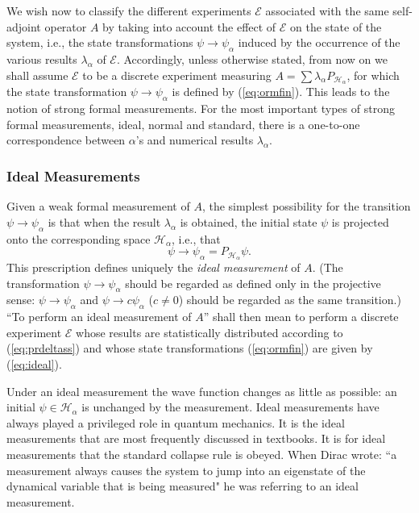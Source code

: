 \documentclass[12pt]{article}
\newcommand{\eq}[1]{(\ref{#1})}
\newcommand{\sa}{self-adjoint}
\newcommand{\wf}{wave function}
\renewcommand{\a}{\alpha}
\newcommand{\la}{\lambda_{\a}}
\newcommand{\psia}{\psi_{\a}}
\newcommand{\Ha}{{\H}_{\a}}
\renewcommand{\H}{\mbox{$\mathcal{H}$}}
\newcommand{\Pa}{ P_{ {\mathcal{H}_{\a} } } }
\newcommand{\E}{\mbox{$\mathscr{E}$}}
\begin{document}
We wish now to classify the different experiments \E{} associated with
the same \sa{} operator $A$ by taking into account the effect of \E{}
on the state of the system, i.e., the state transformations $\psi \to
\psia$ induced by the occurrence of the various results $\la$ of \E{}.
Accordingly, unless otherwise stated, {}from now on we shall assume
$\E$ to be a discrete experiment measuring $A=\sum\la\Pa$, for which
the state transformation $\psi \to \psia$ is defined by
\eq{eq:ormfin}.  This leads to the notion of strong formal
measurements. For the most important types of strong formal
measurements, ideal, normal and standard, there is a one-to-one
correspondence between $\a$'s and numerical results $\la$.

\subsubsection{Ideal Measurements} \label{sec:IM}
Given a weak formal measurement of $A$, the simplest possibility for
the transition $\psi\to\psia$ is that when the result $\la$ is
obtained, the initial state $\psi$ is projected onto the corresponding
space $\Ha$, i.e., that
\begin{equation}
\psi \to \psia = \Pa \psi.
\label{eq:ideal}
\end{equation}
%
This prescription defines uniquely the \emph{ideal measurement} of
$A$.  (The transformation $\psi\to\psia$ should be regarded as defined
only in the projective sense: $\psi \to \psi_\a$ and $\psi \to
c\psi_\a$ ($c\neq 0$) should be regarded as the same transition.)
``To perform an ideal measurement of $A$'' shall then mean to perform
a discrete experiment \E{} whose results are statistically distributed
according to (\ref{eq:prdeltass}) and whose state transformations
\eq{eq:ormfin} are given by (\ref{eq:ideal}).

Under an ideal measurement the \wf{} changes as little as possible: an
initial $\psi \in \Ha$ is unchanged by the measurement.  Ideal
measurements have always played a privileged role in quantum
mechanics. It is the ideal measurements that are most frequently
discussed in textbooks. It is for ideal measurements that the standard
collapse rule is obeyed.  When Dirac \cite{Dir30} wrote: ``a
measurement always causes the system to jump into an eigenstate of the
dynamical variable that is being measured" he was referring to an
ideal measurement.
\end{document}
